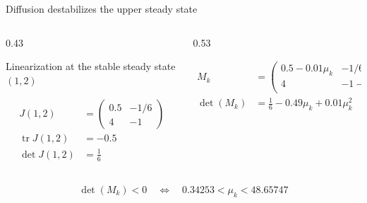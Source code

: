 \begin{frame}{Diffusion destabilizes the upper steady state}

  \vspace{-0.26cm}

  \begin{columns}[c,onlytextwidth]

    \begin{column}{0.43\textwidth}

      {\color{HydraMuted}\fontsize{7.6}{9.3}\selectfont
        Linearization at the stable steady state $(1,2)$
      \par}

      \vspace{-0.28cm}

      {\color{HydraWhite}\fontsize{9.5}{12}\selectfont
      \begin{align*}
        J(1,2)
        &=
        \begin{pmatrix}
          0.5&-1/6
          \\
          4&-1
        \end{pmatrix}
        \\
        \operatorname{tr}J(1,2)
        &=
        -0.5
        \\
        \det J(1,2)
        &=
        \frac{1}{6}
      \end{align*}
      }

    \end{column}

    \begin{column}{0.53\textwidth}

      {\color{HydraWhite}\fontsize{9.2}{11.7}\selectfont
      \begin{align*}
        M_k
        &=
        \begin{pmatrix}
          0.5-0.01\mu_k&-1/6
          \\
          4&-1-\mu_k
        \end{pmatrix}
        \\
        \det(M_k)
        &=
        \frac{1}{6}
        -
        0.49\mu_k
        +
        0.01\mu_k^2
      \end{align*}
      }

    \end{column}

  \end{columns}

  \vspace{-0.34cm}

  {\color{HydraGold}\bfseries\fontsize{11.4}{14.4}\selectfont
  \begin{align*}
    \boxed{
      \det(M_k)<0
      \quad\Longleftrightarrow\quad
      0.34253<\mu_k<48.65747
    }
  \end{align*}
  }

  \vspace{-0.30cm}


\end{frame}


